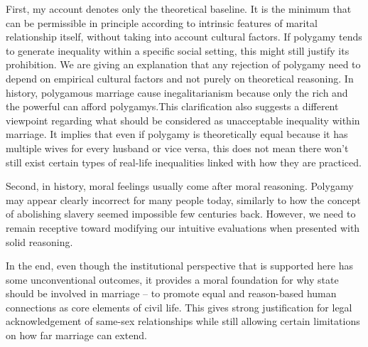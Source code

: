 \documentclass{article}
\begin{document}
First, my account denotes only the theoretical baseline. It is the minimum that can be permissible in principle according to intrinsic features of marital relationship itself, without taking into account cultural factors. If polygamy tends to generate inequality within a specific social setting, this might still justify its prohibition. We are giving an explanation that any rejection of polygamy need to depend on empirical cultural factors and not purely on theoretical reasoning. In history, polygamous marriage cause inegalitarianism because only the rich and the powerful can afford polygamys.This clarification also suggests a different viewpoint regarding what should be considered as unacceptable inequality within marriage. It implies that even if polygamy is theoretically equal because it has multiple wives for every husband or vice versa, this does not mean there won't still exist certain types of real-life inequalities linked with how they are practiced.

Second, in history, moral feelings usually come after moral reasoning. Polygamy may appear clearly incorrect for many people today, similarly to how the concept of abolishing slavery seemed impossible few centuries back. However, we need to remain receptive toward modifying our intuitive evaluations when presented with solid reasoning.

In the end, even though the institutional perspective that is supported here has some unconventional outcomes, it provides a moral foundation for why state should be involved in marriage -- to promote equal and reason-based human connections as core elements of civil life. This gives strong justification for legal acknowledgement of same-sex relationships while still allowing certain limitations on how far marriage can extend.


\printbibliography{}
\end{document}
